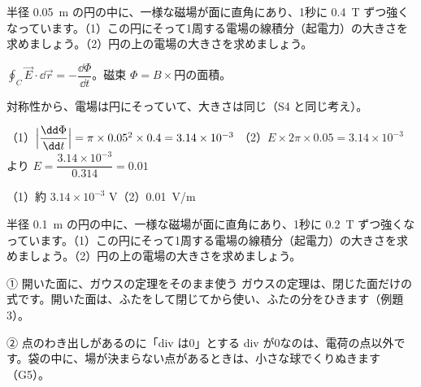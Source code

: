 \begin{reidai}[変わる磁場のまわりの電場]
半径 \qty{0.05}{m} の円の中に、一様な磁場が面に直角にあり、1秒に \qty{0.4}{T} ずつ強くなっています。（1）この円にそって1周する電場の線積分（起電力）の大きさを求めましょう。（2）円の上の電場の大きさを求めましょう。\par
\kangaekata {}\par
{}\enspace $\oint_C\vec E\cdot\dd\vec r=-\dfrac{\dd\Phi}{\dd t}$。磁束 $\Phi=B\times$円の面積。\par
{}\enspace 対称性から、電場は円にそっていて、大きさは同じ（S4 と同じ考え）。\par
\shiki（1）$\Bigl|\dfrac{\dd\Phi}{\dd t}\Bigr|=\pi\times0.05^2\times0.4=3.14\times10^{-3}$\kviiilq
（2）$E\times2\pi\times0.05=3.14\times10^{-3}$ より $E=\dfrac{3.14\times10^{-3}}{0.314}=0.01$\par
\kotae（1）\nobreak 約 $3.14\times10^{-3}$ V\quad（2）\nobreak \qty{0.01}{V/m}
\end{reidai}

\begin{jibun}
半径 \qty{0.1}{m} の円の中に、一様な磁場が面に直角にあり、1秒に \qty{0.2}{T} ずつ強くなっています。（1）この円にそって1周する電場の線積分（起電力）の大きさを求めましょう。（2）円の上の電場の大きさを求めましょう。
\end{jibun}


\begin{tsumazuki}{① 開いた面に、ガウスの定理をそのまま使う}
ガウスの定理は、閉じた面だけの式です。開いた面は、ふたをして閉じてから使い、ふたの分をひきます（例題3）。
\end{tsumazuki}

\begin{tsumazuki}{② 点のわき出しがあるのに「div は0」とする}
div が0なのは、電荷の点以外です。袋の中に、場が決まらない点があるときは、小さな球でくりぬきます（G5）。
\end{tsumazuki}

